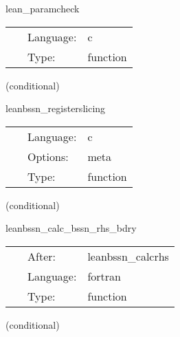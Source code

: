\hspace{5mm} lean\_paramcheck 

\hspace{5mm}{\it check lean parameters for consistency } 


\hspace{5mm}

 \begin{tabular*}{160mm}{cll} 
~ & Language:  & c \\ 
~ & Type:  & function \\ 
\end{tabular*} 


\vspace{5mm}

   (conditional) 

\hspace{5mm} leanbssn\_registerslicing 

\hspace{5mm}{\it register slicing } 


\hspace{5mm}

 \begin{tabular*}{160mm}{cll} 
~ & Language:  & c \\ 
~ & Options:  & meta \\ 
~ & Type:  & function \\ 
\end{tabular*} 


\vspace{5mm}

   (conditional) 

\hspace{5mm} leanbssn\_calc\_bssn\_rhs\_bdry 

\hspace{5mm}{\it mol boundary rhs calculation } 


\hspace{5mm}

 \begin{tabular*}{160mm}{cll} 
~ & After:  & leanbssn\_calcrhs \\ 
~ & Language:  & fortran \\ 
~ & Type:  & function \\ 
\end{tabular*} 


\vspace{5mm}

   (conditional) 

